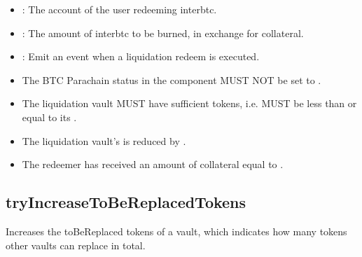 \documentclass[a4paper,10pt,english]{sphinxmanual}
\begin{document}

\begin{itemize}
\item {} 
 : The account of the user redeeming interbtc.

\item {} 
: The amount of interbtc to be burned, in exchange for collateral.

\end{itemize}

\begin{itemize}
\item {} 
: Emit an event when a liquidation redeem is executed.

\end{itemize}

\begin{itemize}
\item {} 
The BTC Parachain status in the {\hyperref[\detokenize{spec/security:security}]{}} component MUST NOT be set to .

\item {} 
The liquidation vault MUST have sufficient tokens, i.e.  MUST be less than or equal to its .

\end{itemize}

\begin{itemize}
\item {} 
The liquidation vault’s  is reduced by .

\item {} 
The redeemer has received an amount of collateral equal to .

\end{itemize}


\subsection{tryIncreaseToBeReplacedTokens}
\label{\detokenize{spec/vault-registry:tryincreasetobereplacedtokens}}\label{\detokenize{spec/vault-registry:id29}}
Increases the toBeReplaced tokens of a vault, which indicates how many tokens other vaults can replace in total.
\end{document}
